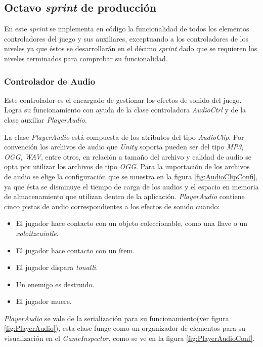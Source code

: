 \subsection{Octavo \textit{sprint} de producción}
En este \textit{sprint} se implementa en código la funcionalidad de todos los 
elementos controladores del juego y sus auxiliares, exceptuando a los 
controladores de los niveles ya que éstos se desarrollarán en el décimo 
\textit{sprint} dado que se requieren los niveles terminados para comprobar su 
funcionalidad.

\subsubsection{Controlador de Audio}
Este controlador es el encargado de gestionar los efectos de sonido del 
juego. Logra su funcionamiento con ayuda de la clase controladora 
\textit{AudioCtrl} y de la clase auxiliar \textit{PlayerAudio}. 
\\
\par
La clase \textit{PlayerAudio} está compuesta de los atributos del tipo 
\textit{AudioClip}. Por convención los archivos de audio que \textit{Unity} 
soporta pueden ser del tipo \textit{MP3}, \textit{OGG}, \textit{WAV}, entre 
otros, en relación a tamaño del archivo y calidad de audio se opta por utilizar 
los archivos de tipo \textit{OGG}. Para la importación de los archivos de audio 
se elige la configuración que se muestra en la figura \ref{fig:AudioClipConfi}, 
ya que ésta se disminuye el tiempo de carga de los audios y el espacio en 
memoria de almacenamiento que utilizan dentro de la aplicación. 
\textit{PlayerAudio} contiene cinco pistas de audio correspondientes a los 
efectos de sonido cuando: 
	\begin{itemize}
		\item El jugador hace contacto con un objeto coleccionable, como una 
		llave o un \textit{xoloitzcuintle}.
		\item El jugador hace contacto con un ítem.
		\item El jugador dispara \textit{tonalli}.
		\item Un enemigo es destruido.
		\item El jugador muere.
	\end{itemize}	 

\textit{PlayerAudio} se vale de la serialización para su funcionamiento(ver 
figura \ref{fig:PlayerAudio}), esta clase funge como un organizador de elementos 
para su visualización en el \textit{GameInspector}, como se ve en la figura 
\ref{fig:PlayerAudioConf}.   

